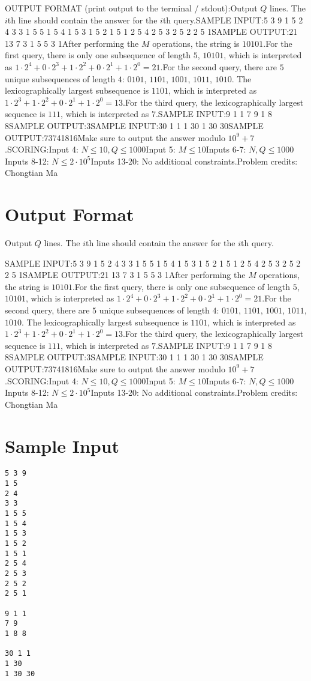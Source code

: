 \documentclass[12pt]{article}
\begin{document}
OUTPUT FORMAT (print output to the terminal / stdout):Output $Q$ lines. The $i$th line should contain the answer for the $i$th query.SAMPLE INPUT:5 3 9
1 5
2 4
3 3
1 5 5
1 5 4
1 5 3
1 5 2
1 5 1
2 5 4
2 5 3
2 5 2
2 5 1SAMPLE OUTPUT:21
13
7
3
1
5
5
3
1After performing the $M$ operations, the string is $10101$.For the first query, there is only one subsequence of length $5$, $10101$, which
is interpreted as
$1 \cdot 2^4 + 0 \cdot 2^3 + 1 \cdot 2^2 + 0 \cdot 2^1 + 1 \cdot 2^0 = 21$.For the second query, there are $5$ unique subsequences of length $4$: $0101$,
$1101$, $1001$, $1011$, $1010$. The lexicographically largest subsequence is
$1101$, which is interpreted as
$1 \cdot 2^3 + 1 \cdot 2^2 + 0 \cdot 2^1 + 1\cdot 2^0 = 13$.For the third query, the lexicographically largest sequence is $111$, which is
interpreted as $7$.SAMPLE INPUT:9 1 1
7 9
1 8 8SAMPLE OUTPUT:3SAMPLE INPUT:30 1 1
1 30
1 30 30SAMPLE OUTPUT:73741816Make sure to output the answer modulo $10^9+7$.SCORING:Input 4: $N \leq 10, Q \leq 1000$Input 5: $M \leq 10$Inputs 6-7: $N, Q \leq 1000$Inputs 8-12: $N \leq 2 \cdot 10^5$Inputs 13-20: No additional constraints.Problem credits: Chongtian Ma

\section*{Output Format}
Output $Q$ lines. The $i$th line should contain the answer for the $i$th query.

SAMPLE INPUT:5 3 9
1 5
2 4
3 3
1 5 5
1 5 4
1 5 3
1 5 2
1 5 1
2 5 4
2 5 3
2 5 2
2 5 1SAMPLE OUTPUT:21
13
7
3
1
5
5
3
1After performing the $M$ operations, the string is $10101$.For the first query, there is only one subsequence of length $5$, $10101$, which
is interpreted as
$1 \cdot 2^4 + 0 \cdot 2^3 + 1 \cdot 2^2 + 0 \cdot 2^1 + 1 \cdot 2^0 = 21$.For the second query, there are $5$ unique subsequences of length $4$: $0101$,
$1101$, $1001$, $1011$, $1010$. The lexicographically largest subsequence is
$1101$, which is interpreted as
$1 \cdot 2^3 + 1 \cdot 2^2 + 0 \cdot 2^1 + 1\cdot 2^0 = 13$.For the third query, the lexicographically largest sequence is $111$, which is
interpreted as $7$.SAMPLE INPUT:9 1 1
7 9
1 8 8SAMPLE OUTPUT:3SAMPLE INPUT:30 1 1
1 30
1 30 30SAMPLE OUTPUT:73741816Make sure to output the answer modulo $10^9+7$.SCORING:Input 4: $N \leq 10, Q \leq 1000$Input 5: $M \leq 10$Inputs 6-7: $N, Q \leq 1000$Inputs 8-12: $N \leq 2 \cdot 10^5$Inputs 13-20: No additional constraints.Problem credits: Chongtian Ma

\section*{Sample Input}
\begin{verbatim}
5 3 9
1 5
2 4
3 3
1 5 5
1 5 4
1 5 3
1 5 2
1 5 1
2 5 4
2 5 3
2 5 2
2 5 1

9 1 1
7 9
1 8 8

30 1 1
1 30
1 30 30
\end{verbatim}
\end{document}
